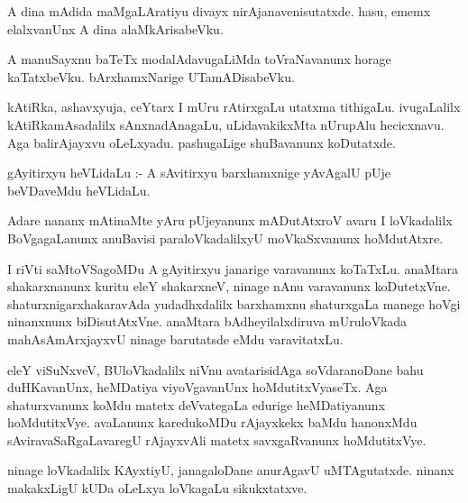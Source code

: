 \documentclass{article}
\begin{document}
\begin{mn}
A dina  mAdida  maMgaLAratiyu divayx  nirAjanavenisutatxde.  hasu,  ememx elalxvanUnx  A dina alaMkArisabeVku.
\end{mn}

\begin{mn}
A manuSayxnu  baTeTx  modalAdavugaLiMda  toVraNavanunx  horage kaTatxbeVku.  bArxhamxNarige  UTamADisabeVku.
\end{mn}

\begin{mn}
kAtiRka,  ashavxyuja,  ceYtarx I  mUru rAtirxgaLu  utatxma tithigaLu.  ivugaLalilx  
kAtiRkamAsadalilx  sAnxnadAnagaLu,  uLidavakikxMta  nUrupAlu  hecicxnavu.  
Aga  balirAjayxvu  oLeLxyadu.  pashugaLige  shuBavanunx  koDutatxde.
\end{mn}

\begin{mn}
gAyitirxyu  heVLidaLu :- A sAvitirxyu  barxhamxnige  yAvAgalU  pUje beVDaveMdu  heVLidaLu.
\end{mn}

\begin{mn}
Adare  nananx  mAtinaMte  yAru  pUjeyanunx  mADutAtxroV  avaru  I  loVkadalilx  
BoVgagaLanunx  anuBavisi  paraloVkadalilxyU  moVkaSxvanunx  hoMdutAtxre. 
\end{mn}

\begin{mn}
I riVti  saMtoVSagoMDu  A  gAyitirxyu  janarige  varavanunx  koTaTxLu.  anaMtara  
shakarxnanunx  kuritu  eleY  shakarxneV,  ninage  nAnu varavanunx  koDutetxVne.  
shaturxnigarxhakaravAda  yudadhxdalilx  barxhamxnu  shaturxgaLa manege  hoVgi  
ninanxnunx  biDisutAtxVne.  anaMtara  bAdheyilalxdiruva  mUruloVkada  
mahAsAmArxjayxvU  ninage  barutatsde  eMdu  varavitatxLu.
\end{mn}

\begin{mn}
eleY  viSuNxveV,  BUloVkadalilx  niVnu  avatarisidAga  soVdaranoDane  bahu  
duHKavanUnx,  heMDatiya  viyoVgavanUnx  hoMdutitxVyaseTx.  Aga  shaturxvanunx  
koMdu  matetx  deVvategaLa  edurige  heMDatiyanunx  hoMdutitxVye.  avaLanunx  
karedukoMDu  rAjayxkekx baMdu  hanonxMdu  sAviravaSaRgaLavaregU  rAjayxvAli  
matetx  savxgaRvanunx  hoMdutitxVye.
\end{mn}

\begin{mn}
ninage loVkadalilx  KAyxtiyU,  janagaloDane  anurAgavU  uMTAgutatxde.  
ninanx  makakxLigU  kUDa  oLeLxya  loVkagaLu  sikukxtatxve. 
\end{mn}
\end{document}
